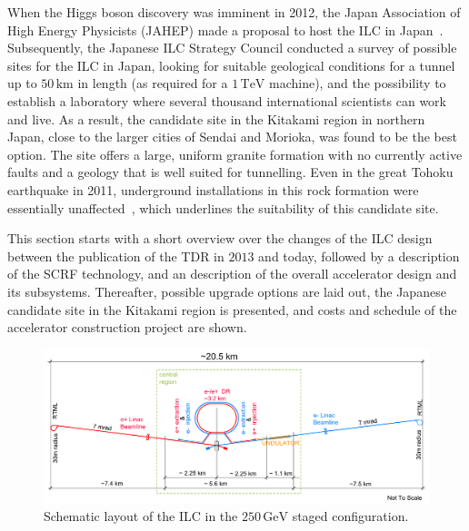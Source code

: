 When the Higgs boson discovery was imminent in 2012, the Japan Association of High Energy Physicists (JAHEP) made a proposal to host the ILC in Japan~\cite{JAHEP:2012a,JAHEP:2012b}. 
Subsequently, the Japanese ILC Strategy Council conducted a survey of possible sites for the ILC in Japan, looking for  suitable geological conditions for a tunnel up to $50\,{\mathrm{km}}$ in length (as required for a $1\,{\mathrm{TeV}}$  machine), and the possibility to establish a laboratory where several thousand international scientists can work and live. 
As a result, the candidate site in the Kitakami region in northern Japan, close to the larger cities of Sendai and Morioka, was found to be the best option. 
The site offers a large, uniform granite formation with no currently active faults and a geology that is well suited for tunnelling.
Even in the great Tohoku earthquake in 2011, underground installations in this rock formation were essentially unaffected~\cite{bib:sanuki:desy2017}, which underlines the suitability of this candidate site. 

This section starts with a short overview over the changes of the ILC design between the publication of the TDR in $2013$ and today, followed by a description of the SCRF technology, and an description of the overall accelerator design and its subsystems. 
Thereafter, possible upgrade options are laid out, the Japanese candidate site in the Kitakami region is presented, and costs and schedule of the accelerator construction project are shown.


 \begin{figure}[tbhp]
 \begin{center}
 \includegraphics[width=\hsize]{chapters/figures/TDR-machine-layout-cartoon-staged-mirror.pdf}
\caption{Schematic layout of the ILC in the $250\,{\mathrm{GeV}}$ staged configuration.
\label{fig:ilc-schematic}}
 \end{center}
 \end{figure}

